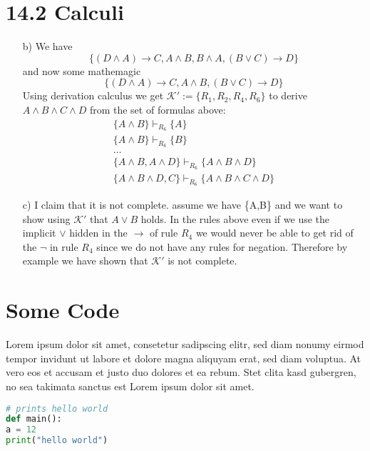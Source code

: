 \documentclass[12pt]{article}
\title{\titleVar}
\date{\today}
\author{\authorVar}
\begin{document}
\maketitle

\thispagestyle{fancy}


\section*{14.2 Calculi}
\begin{itemize}
    \item[b)] We have $$\{(D \land A) \rightarrow C, A \land B, B \land A, (B \lor C) \rightarrow D\}$$and now some mathemagic  $$\{(D \land A) \rightarrow C, A \land B, (B \lor C) \rightarrow D\}$$ Using derivation calculus we get $\mathcal{K}' := \{R_1,R_2,R_4,R_6\}$ to derive $A\land B \land C \land D$ from the set of formulas above:
    \begin{equation*}
    \begin{gathered}
        \{A\land B\} \vdash_{R_6} \{A\}\\
        \{A\land B\} \vdash_{R_6} \{B\}\\
 			\ldots \\
        \{A \land B, A \land D\} \vdash_{R_6} \{A \land B \land D\}\\
        \{A \land B \land D , C\} \vdash_{R_6} \{A \land B \land C \land D\}
        \end{gathered}
    \end{equation*}
    
    \item[c)] I claim that it is not complete. assume we have \{A,B\} and we want to show using $\mathcal{K}'$ that $A \lor B$ holds. In the rules above even if we use the implicit $\lor$ hidden in the $\rightarrow$ of rule $R_4$ we would never be able to get rid of the $\neg$ in rule $R_4$ since we do not have any rules for negation. Therefore by example we have shown that $\mathcal{K'}$ is not complete.
    
\end{itemize}

\section*{Some Code}
Lorem ipsum dolor sit amet, consetetur sadipscing elitr, sed diam nonumy eirmod tempor invidunt ut labore et dolore magna aliquyam erat, sed diam voluptua. At vero eos et accusam et justo duo dolores et ea rebum. Stet clita kasd gubergren, no sea takimata sanctus est Lorem ipsum dolor sit amet.
\begin{lstlisting}[language=Python]
# prints hello world
def main():
a = 12
print("hello world")
\end{lstlisting}
\lipsum[2]
\end{document}
